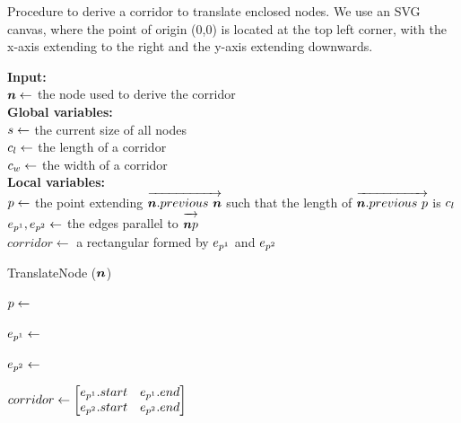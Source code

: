 \begin{algorithm}[tb!]
    \caption{Procedure to derive a corridor to translate enclosed nodes. We use an SVG canvas, where the point of origin (0,0) is located at the top left corner, with the x-axis extending to the right and the y-axis extending downwards.}\label{alg:derive corridor}

    \textbf{Input:} \\
    $ \bm{n} \gets $ the node used to derive the corridor \\

    \textbf{Global variables:} \\
    $ s \gets $ the current size of all nodes \\
    $ c_l \gets $ the length of a corridor \\
    $ c_w \gets $ the width of a corridor \\

    \textbf{Local variables:} \\
    $ p \gets $ the point extending $ \protect\overrightarrow{\bm{n}.previous~\bm{n}\strut} $ such that the length of $ \protect\overrightarrow{\bm{n}.previous~p\strut} $ is $ c_l $\\
    $ e_{p^1}, e_{p^2} \gets $ the edges parallel to $ \protect\overrightarrow{\bm{n}p\strut} $ \\
    $ corridor \gets $ a rectangular formed by $ e_{p^1} $ and $ e_{p^2} $ \\

    \begin{algorithmic}[1]
            \State TranslateNode ($ \bm{n} $)

            \State $ p \gets $ 

            \State $ e_{p^1} \gets $ 

            \State $ e_{p^2} \gets $ 

            \State $ corridor \gets
                \begin{bmatrix}
                    \EdgeParallelA.start &
                    \EdgeParallelA.end \\

                    \EdgeParallelB.start &
                    \EdgeParallelB.end \\
                \end{bmatrix} $


\end{algorithmic}
\end{algorithm}
